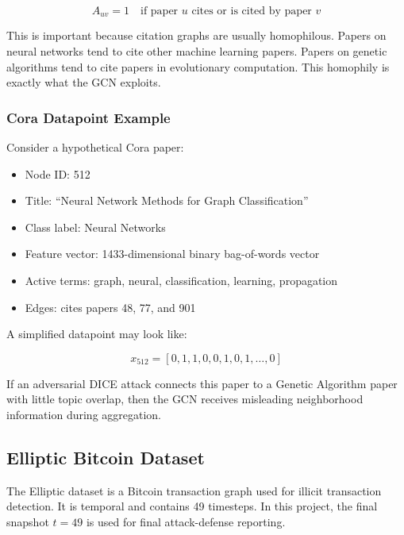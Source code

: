 \documentclass[12pt,a4paper]{article}
\begin{document}
$$
A_{uv}=1 \quad \text{if paper } u \text{ cites or is cited by paper } v
$$

This is important because citation graphs are usually homophilous. Papers on neural networks tend to cite other machine learning papers. Papers on genetic algorithms tend to cite papers in evolutionary computation. This homophily is exactly what the GCN exploits.

\subsubsection{Cora Datapoint Example}
Consider a hypothetical Cora paper:

\begin{itemize}
    \item Node ID: 512
    \item Title: ``Neural Network Methods for Graph Classification''
    \item Class label: Neural Networks
    \item Feature vector: 1433-dimensional binary bag-of-words vector
    \item Active terms: graph, neural, classification, learning, propagation
    \item Edges: cites papers 48, 77, and 901
\end{itemize}

A simplified datapoint may look like:

$$
x_{512} = [0,1,1,0,0,1,0,1,\ldots,0]
$$

If an adversarial DICE attack connects this paper to a Genetic Algorithm paper with little topic overlap, then the GCN receives misleading neighborhood information during aggregation.

\subsection{Elliptic Bitcoin Dataset}
The Elliptic dataset is a Bitcoin transaction graph used for illicit transaction detection. It is temporal and contains 49 timesteps. In this project, the final snapshot $t=49$ is used for final attack-defense reporting.
\end{document}
